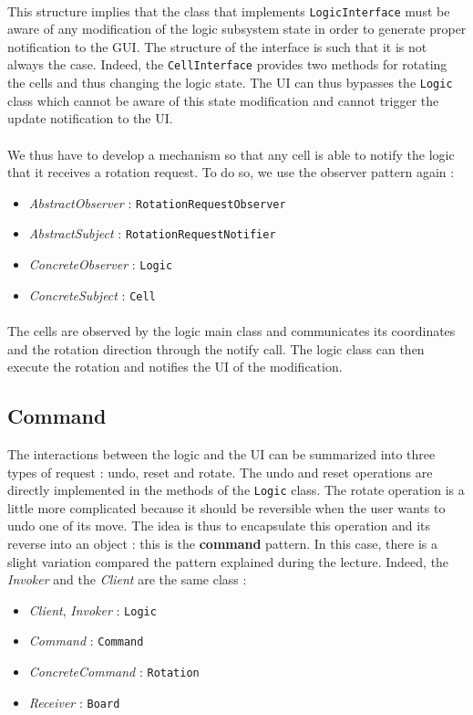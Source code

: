 \documentclass[a4paper,11pt]{article}
\begin{document}
\paragraph{}
 This structure implies that the class that implements \texttt{LogicInterface} must be aware of any modification of the logic subsystem state in order to generate proper notification to the GUI. The structure of the interface is such that it is not always the case. Indeed, the \texttt{CellInterface} provides two methods for rotating the cells and thus changing the logic state. The UI can thus bypasses the \texttt{Logic} class which cannot be aware of this state modification and cannot trigger the update notification to the UI.
\\ \\ 
We thus have to develop a mechanism so that any cell is able to notify the logic that it receives a rotation request. To do so, we use the observer pattern again :\\
\begin{itemize}
	\item \textit{AbstractObserver} : \texttt{RotationRequestObserver}
	\item \textit{AbstractSubject} : \texttt{RotationRequestNotifier}
	\item \textit{ConcreteObserver} : \texttt{Logic}
	\item \textit{ConcreteSubject} : \texttt{Cell}
\end{itemize}
\paragraph{}
The cells are observed by the logic main class and communicates its coordinates and the rotation direction through the notify call. The logic class can then execute the rotation and notifies the UI of the modification.
\subsection{Command}
The interactions between the logic and the UI can be summarized into three types of request : undo, reset and rotate.  The undo and reset operations are directly implemented in the methods of the \texttt{Logic} class. The rotate operation is a little more complicated because it should be reversible when the user wants to undo one of its move. The idea is thus to encapsulate this operation and its reverse into an object : this is the \textbf{command} pattern. In this case, there is a slight variation compared the pattern explained during the lecture. Indeed, the \textit{Invoker} and the \textit{Client} are the same class : \\
\begin{itemize}
	\item \textit{Client}, \textit{Invoker} : \texttt{Logic}
	\item \textit{Command} : \texttt{Command}
	\item \textit{ConcreteCommand} : \texttt{Rotation}
	\item \textit{Receiver} : \texttt{Board}
\end{itemize}
\end{document}
